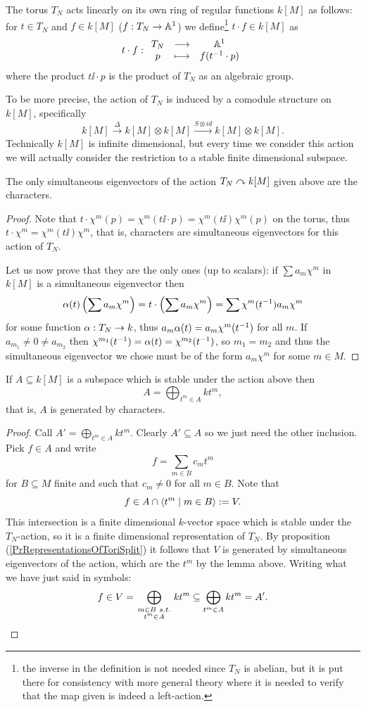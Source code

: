 \begin{remark}
The torus $T_N$ acts linearly on its own ring of regular functions $k[M]$ as follows: for $t\in T_N$ and $f\in k[M]$ ($f:T_N\to \mathbb{A}^1$) we define\footnote{the inverse in the definition is not needed since $T_N$ is abelian, but it is put there for consistency with more general theory where it is needed to verify that the map given is indeed a left-action.} $t\cdot f\in k[M]$ as
\[t\cdot f:\begin{array}{ccc} {T_N} & \longrightarrow & {\mathbb{A}^1}\\ {p} & \longmapsto & {f({t^{-1}\cdot p})} \end{array}\]
where the product $t\ii\cdot p$ is the product of $T_N$ as an algebraic group.

To be more precise, the action of $T_N$ is induced by a comodule structure on $k[M]$, specifically
\[k[M]\xrightarrow{\Delta}k[M]\otimes k[M]\xrightarrow{S\otimes id}k[M]\otimes k[M].\]
Technically $k[M]$ is infinite dimensional, but every time we consider this action we will actually consider the restriction to a stable finite dimensional subspace.
\end{remark}

\begin{lemma}[]\label{LmSimultaneousEigenvectorsForActionOfTorusAreTheCharacters}
The only simultaneous eigenvectors of the action $T_N\curvearrowright k[M]$ given above are the characters.
\end{lemma}
\begin{proof}
Note that $t\cdot \chi^m (p)=\chi^m(t\ii\cdot p)=\chi^m(t\ii)\chi^m(p)$ on the torus, thus $t\cdot \chi^m=\chi^m(t\ii) \chi^m$, that is, characters are simultaneous eigenvectors for this action of $T_N$. 

Let us now prove that they are the only ones (up to scalars):
if $\sum a_m \chi^m$ in $k[M]$ is a simultaneous eigenvector then 
\[\alpha(t)\left({\sum a_m \chi^m}\right)=t\cdot \left({\sum a_m \chi^m}\right)=\sum \chi^m(t^{-1})a_m \chi^m\]
for some function $\alpha:T_N\to k$, thus $a_m\alpha(t)=a_m\chi^m(t^{-1})$ for all $m$. If $a_{m_1}\neq 0\neq a_{m_2}$ then $\chi^{m_1}(t^{-1})=\alpha(t)=\chi^{m_2}(t^{-1})$, so $m_1=m_2$ and thus the simultaneous eigenvector we chose must be of the form $a_m \chi^m$ for some $m\in M$.
\end{proof}

\begin{lemma}
If $A\subseteq k[M]$ is a subspace which is stable under the action above then
\[A=\bigoplus_{t^m\in A}k t^m,\]
that is, $A$ is generated by characters.
\end{lemma}
\begin{proof}
Call $A'=\bigoplus_{t^m\in A}k t^m$. Clearly $A'\subseteq A$ so we just need the other inclusion. Pick $f\in A$ and write
\[f=\sum_{m\in B}c_m t^m\]
for $B\subseteq M$ finite and such that $c_m\neq 0$ for all $m\in B$. Note that
\[f\in A\cap \left\langle {t^m\mid m\in B}\right\rangle:=V.\]
This intersection is a finite dimensional $k$-vector space which is stable under the $T_N$-action, so it is a finite dimensional representation of $T_N$. By proposition (\ref{PrRepresentationsOfToriSplit}) it follows that $V$ is generated by simultaneous eigenvectors of the action, which are the $t^m$ by the lemma above. Writing what we have just said in symbols: 
\[f\in V=\bigoplus_{\begin{smallmatrix}m\in B\ s.t.\\ t^m\in A\end{smallmatrix}}kt^m\subseteq \bigoplus_{t^m\in A}k t^m=A'.\]
\end{proof}

